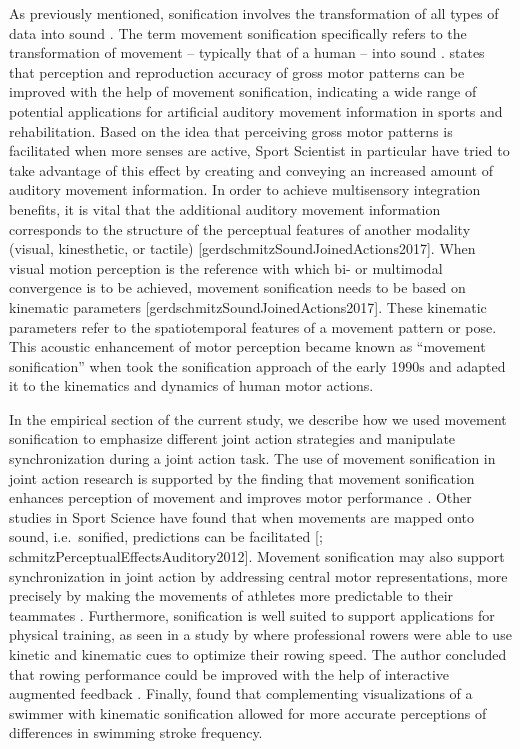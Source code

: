 \documentclass[10pt,a4paper,onecolumn]{article}
\begin{document}
As previously mentioned, sonification involves the transformation of all types of data into sound \autocite{kramerSonificationReportStatus1999}. The term movement sonification specifically refers to the transformation of movement -- typically that of a human -- into sound \autocite{vinkenAuditoryCodingHuman2013}. \textcite{effenbergMovementSonificationEffects2005} states that perception and reproduction accuracy of gross motor patterns can be improved with the help of movement sonification, indicating a wide range of potential applications for artificial auditory movement information in sports and rehabilitation. Based on the idea that perceiving gross motor patterns is facilitated when more senses are active, Sport Scientist in particular have tried to take advantage of this effect by creating and conveying an increased amount of auditory movement information. In order to achieve multisensory integration benefits, it is vital that the additional auditory movement information corresponds to the structure of the perceptual features of another modality (visual, kinesthetic, or tactile) {[}gerdschmitzSoundJoinedActions2017{]}. When visual motion perception is the reference with which bi- or multimodal convergence is to be achieved, movement sonification needs to be based on kinematic parameters {[}gerdschmitzSoundJoinedActions2017{]}. These kinematic parameters refer to the spatiotemporal features of a movement pattern or pose. This acoustic enhancement of motor perception became known as ``movement sonification'' when \textcite{effenbergMovementSonificationEffects2005} took the sonification approach of the early 1990s and adapted it to the kinematics and dynamics of human motor actions.

In the empirical section of the current study, we describe how we used movement sonification to emphasize different joint action strategies and manipulate synchronization during a joint action task. The use of movement sonification in joint action research is supported by the finding that movement sonification enhances perception of movement and improves motor performance \autocite{schmitzObservationSonifiedMovements2013}. Other studies in Sport Science have found that when movements are mapped onto sound, i.e.~sonified, predictions can be facilitated {[}\textcite{effenbergMovementSonificationEffects2005}; schmitzPerceptualEffectsAuditory2012{]}. Movement sonification may also support synchronization in joint action by addressing central motor representations, more precisely by making the movements of athletes more predictable to their teammates \autocite{schmitzPerceptualEffectsAuditory2012}. Furthermore, sonification is well suited to support applications for physical training, as seen in a study by \textcite{dubusEvaluationFourModels2012} where professional rowers were able to use kinetic and kinematic cues to optimize their rowing speed. The author concluded that rowing performance could be improved with the help of interactive augmented feedback \autocite{dubusEvaluationFourModels2012}. Finally, \textcite{schmitzSoundJoinedActions2017} found that complementing visualizations of a swimmer with kinematic sonification allowed for more accurate perceptions of differences in swimming stroke frequency.
\end{document}
